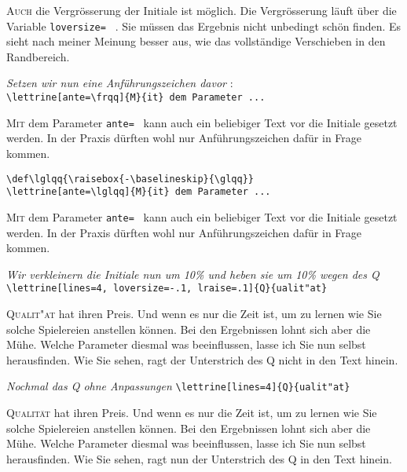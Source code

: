 \documentclass[12pt,a4paper]{article}
\begin{document}
\lettrine[lines=3, lhang=0.33, loversize=0.25]{A}{uch}
die Vergr\"osserung der Initiale ist m\"oglich. Die Vergr\"osserung l\"auft
\"uber die Variable \verb+loversize= + . Sie m\"ussen das Ergebnis nicht
unbedingt sch\"on finden. Es sieht nach meiner Meinung besser aus, wie das
vollst\"andige Verschieben in den Randbereich.

\vspace{\baselineskip}
\textit{Setzen wir nun eine %
         Anf\"uhrungszeichen davor} :\\
\verb+\lettrine[ante=\frqq]{M}{it} dem Parameter ...+

\lettrine[ante=\frqq]{M}{it} dem Parameter \verb+ante= + kann auch ein
beliebiger Text vor die Initiale gesetzt werden. In der Praxis d\"urften
wohl nur Anf\"uhrungszeichen daf\"ur in Frage kommen.

\vspace{\baselineskip}
\verb+\def\lglqq{\raisebox{-\baselineskip}{\glqq}}+\\
\verb+\lettrine[ante=\lglqq]{M}{it} dem Parameter ...+
\def\lglqq{\raisebox{-\baselineskip}{\glqq}}

\lettrine[ante=\lglqq]{M}{it} dem Parameter \verb+ante= + kann auch ein
beliebiger Text vor die Initiale gesetzt werden. In der Praxis d\"urften
wohl nur Anf\"uhrungszeichen daf\"ur in Frage kommen.

\newpage
\vspace{\baselineskip}
\textit{Wir verkleinern die Initiale nun um 10\% und heben sie
um 10\% wegen des {\glqq}Q{\grqq}}
\verb+\lettrine[lines=4, loversize=-.1, lraise=.1]{Q}{ualit"at}+

\lettrine[lines=4, loversize=-.1, lraise=.1]{Q}{ualit"at} hat ihren
Preis.  Und wenn es nur die Zeit ist, um zu lernen wie Sie solche Spielereien
anstellen k\"onnen. Bei den Ergebnissen lohnt sich aber die M\"uhe. Welche
Parameter diesmal was beeinflussen, lasse ich Sie nun selbst herausfinden.
Wie Sie sehen, ragt der Unterstrich des {\glqq}Q{\grqq} nicht in den Text
hinein.

\vspace{\baselineskip}
\textit{Nochmal das {\glqq}Q{\grqq} ohne Anpassungen}
\verb+\lettrine[lines=4]{Q}{ualit"at}+

\lettrine[lines=4]{Q}{ualit\"at} hat ihren Preis.  Und wenn es nur die Zeit
ist, um zu lernen wie Sie solche Spielereien anstellen k\"onnen. Bei den
Ergebnissen lohnt sich aber die M\"uhe. Welche Parameter diesmal was
beeinflussen, lasse ich Sie nun selbst herausfinden. Wie Sie sehen, ragt nun
der Unterstrich des {\glqq}Q{\grqq} in den Text hinein.
\end{document}
